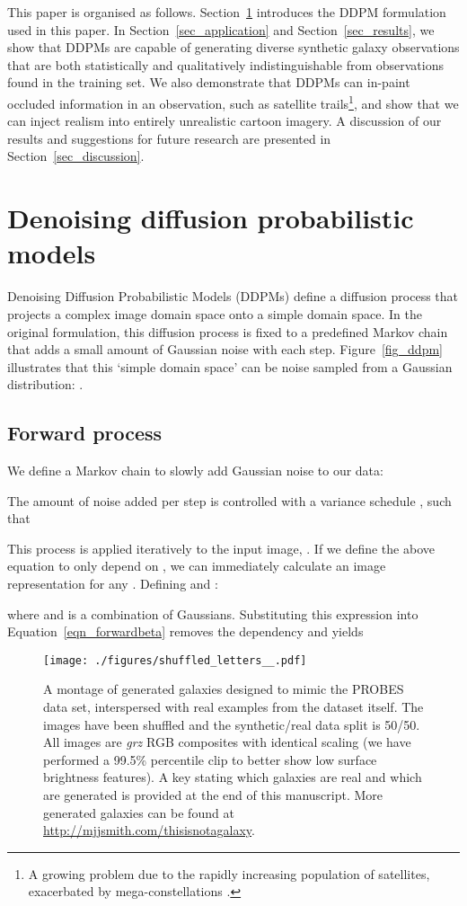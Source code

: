 \documentclass[fleqn,usenatbib]{mnras}
\begin{document}
This paper is organised as follows. Section~\ref{sec_ddpm} introduces the
DDPM formulation used in this paper. In Section~\ref{sec_application} and
Section~\ref{sec_results}, we show that DDPMs are capable of generating diverse
synthetic galaxy observations that are both statistically and qualitatively
indistinguishable from observations found in the training set. We also
demonstrate that DDPMs can in-paint occluded information in an observation,
such as satellite trails\footnote{A
growing problem due to the rapidly increasing population of satellites,
exacerbated by mega-constellations \citep{cite_kocifaj2021}.}, and show that we
can inject realism into entirely unrealistic cartoon imagery. A discussion of
our results and suggestions for future research are presented in
Section~\ref{sec_discussion}.

\section{Denoising diffusion probabilistic models} \label{sec_ddpm}

Denoising Diffusion Probabilistic Models (DDPMs) define a diffusion process
that projects a complex image domain space onto a simple domain space. In the
original formulation, this diffusion process is fixed to a predefined Markov
chain that adds a small amount of Gaussian noise with each step.
Figure~\ref{fig_ddpm} illustrates that this `simple domain space' can be noise
sampled from a Gaussian distribution: .

\subsection{Forward process}

We define a Markov chain to slowly add Gaussian noise to our data: 

The amount of noise added per step is controlled with a variance schedule
, such that

This process is applied iteratively to the input image, . 
If we define the above equation to only depend on , we
can immediately calculate an image representation  for any 
\citep{cite_ho2020}. Defining  and
:

where  and
 is a combination of Gaussians. Substituting this
expression into Equation~\ref{eqn_forwardbeta} removes the 
dependency and yields



\begin{figure*}
    \texttt{[image: ./figures/shuffled\_letters\_\_.pdf]}
    \caption{A montage of generated galaxies designed to mimic the PROBES data
    set, interspersed with real examples from the dataset itself. The images
    have been shuffled and the synthetic/real data split is 50/50. All images
    are {\it grz} RGB composites with identical scaling (we have performed a
    99.5\% percentile clip to better show low surface brightness features). A key
    stating which galaxies are real and which are generated is provided at the
    end of this manuscript. More generated galaxies can be found at
    \url{http://mjjsmith.com/thisisnotagalaxy}.}
    \label{FIG_GALAXIES}
\end{figure*}
\end{document}
